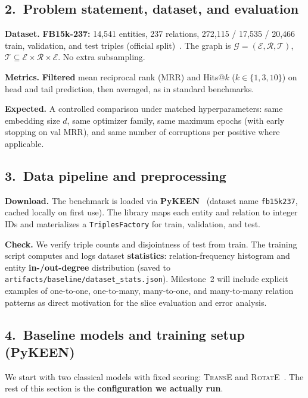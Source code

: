 \documentclass[10pt,a4paper]{article}
\begin{document}
\subsection*{2.\ Problem statement, dataset, and evaluation}
\textbf{Dataset.} \textbf{FB15k-237:} 14,541 entities, 237 relations, 272,115 / 17,535 / 20,466 train, validation, and test triples (official split)~\citep{sun2019rotate}. The graph is $\mathcal{G}=(\mathcal{E},\mathcal{R},\mathcal{T})$, $\mathcal{T}\subseteq\mathcal{E}\times\mathcal{R}\times\mathcal{E}$. No extra subsampling.

\textbf{Metrics.} \textbf{Filtered} mean reciprocal rank (MRR) and Hits@$k$ ($k\in\{1,3,10\}$) on head and tail prediction, then averaged, as in standard benchmarks.

\textbf{Expected.} A controlled comparison under matched hyperparameters: same embedding size $d$, same optimizer family, same maximum epochs (with early stopping on val MRR), and same number of corruptions per positive where applicable.

\subsection*{3.\ Data pipeline and preprocessing}
\textbf{Download.} The benchmark is loaded via \textbf{PyKEEN}~\citep{ali2021pykeen} (dataset name \texttt{fb15k237}, cached locally on first use). The library maps each entity and relation to integer IDs and materializes a \texttt{TriplesFactory} for train, validation, and test.

\textbf{Check.} We verify triple counts and disjointness of test from train. The training script computes and logs dataset \textbf{statistics}: relation-frequency histogram and entity \textbf{in-/out-degree} distribution 
(saved to \texttt{artifacts/baseline/dataset\_stats.json}). Milestone~2 will include explicit examples of one-to-one, one-to-many, many-to-one, and many-to-many relation patterns as direct motivation for the slice evaluation and error analysis.

\subsection*{4.\ Baseline models and training setup (PyKEEN)}
We start with two classical models with fixed scoring: \textsc{TransE} and \textsc{RotatE}~\citep{sun2019rotate}. The rest of this section is the \textbf{configuration we actually run}.
\end{document}
